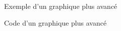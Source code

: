 \documentclass[10.5pt,a4paper]{article}
\begin{document}
    \begin{figure}[H]
    \centering
    \caption{Exemple d'un graphique plus avancé}
    \label{revenueDistri}
    \end{figure}
    
     \begin{figure}[H]
    \centering
    \caption{Code d'un graphique plus avancé}
    \label{visCode}
    \end{figure}
  
 
%
%
\end{document}
